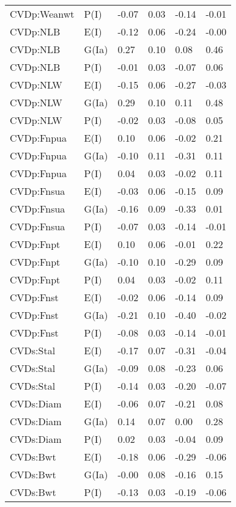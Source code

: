 \begin{center}
\begin{longtable}{|p{1.1in}|p{0.7in}|p{0.7in}|p{0.6in}|p{0.6in}|p{0.6in}|}
  CVDp:Weanwt & P(I) & -0.07 & 0.03 & -0.14 & -0.01 \\ 
  CVDp:NLB & E(I) & -0.12 & 0.06 & -0.24 & -0.00 \\ 
  CVDp:NLB & G(Ia) & 0.27 & 0.10 & 0.08 & 0.46 \\ 
  CVDp:NLB & P(I) & -0.01 & 0.03 & -0.07 & 0.06 \\ 
  CVDp:NLW & E(I) & -0.15 & 0.06 & -0.27 & -0.03 \\ 
  CVDp:NLW & G(Ia) & 0.29 & 0.10 & 0.11 & 0.48 \\ 
  CVDp:NLW & P(I) & -0.02 & 0.03 & -0.08 & 0.05 \\ 
  CVDp:Fnpua & E(I) & 0.10 & 0.06 & -0.02 & 0.21 \\ 
  CVDp:Fnpua & G(Ia) & -0.10 & 0.11 & -0.31 & 0.11 \\ 
  CVDp:Fnpua & P(I) & 0.04 & 0.03 & -0.02 & 0.11 \\ 
  CVDp:Fnsua & E(I) & -0.03 & 0.06 & -0.15 & 0.09 \\ 
  CVDp:Fnsua & G(Ia) & -0.16 & 0.09 & -0.33 & 0.01 \\ 
  CVDp:Fnsua & P(I) & -0.07 & 0.03 & -0.14 & -0.01 \\ 
  CVDp:Fnpt & E(I) & 0.10 & 0.06 & -0.01 & 0.22 \\ 
  CVDp:Fnpt & G(Ia) & -0.10 & 0.10 & -0.29 & 0.09 \\ 
  CVDp:Fnpt & P(I) & 0.04 & 0.03 & -0.02 & 0.11 \\ 
  CVDp:Fnst & E(I) & -0.02 & 0.06 & -0.14 & 0.09 \\ 
  CVDp:Fnst & G(Ia) & -0.21 & 0.10 & -0.40 & -0.02 \\ 
  CVDp:Fnst & P(I) & -0.08 & 0.03 & -0.14 & -0.01 \\ 
  CVDs:Stal & E(I) & -0.17 & 0.07 & -0.31 & -0.04 \\ 
  CVDs:Stal & G(Ia) & -0.09 & 0.08 & -0.23 & 0.06 \\ 
  CVDs:Stal & P(I) & -0.14 & 0.03 & -0.20 & -0.07 \\ 
  CVDs:Diam & E(I) & -0.06 & 0.07 & -0.21 & 0.08 \\ 
  CVDs:Diam & G(Ia) & 0.14 & 0.07 & 0.00 & 0.28 \\ 
  CVDs:Diam & P(I) & 0.02 & 0.03 & -0.04 & 0.09 \\ 
  CVDs:Bwt & E(I) & -0.18 & 0.06 & -0.29 & -0.06 \\ 
  CVDs:Bwt & G(Ia) & -0.00 & 0.08 & -0.16 & 0.15 \\ 
  CVDs:Bwt & P(I) & -0.13 & 0.03 & -0.19 & -0.06 \\ 

\end{longtable}
\end{center}
